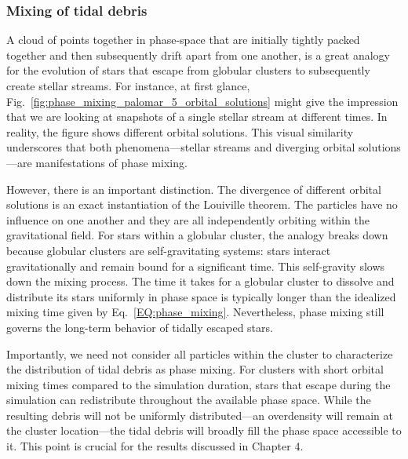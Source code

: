         \subsubsection{Mixing of tidal debris}

            A cloud of points together in phase-space that are initially tightly packed together and then subsequently drift apart from one another, is a great analogy for the evolution of stars that escape from globular clusters to subsequently create stellar streams. For instance, at first glance, Fig.~\ref{fig:phase_mixing_palomar_5_orbital_solutions} might give the impression that we are looking at snapshots of a single stellar stream at different times. In reality, the figure shows different orbital solutions. This visual similarity underscores that both phenomena—stellar streams and diverging orbital solutions—are manifestations of phase mixing. 
            
            However, there is an important distinction. The divergence of different orbital solutions is an exact instantiation of the Louiville theorem. The particles have no influence on one another and they are all independently orbiting within the gravitational field. For stars within a globular cluster, the analogy breaks down because globular clusters are self-gravitating systems: stars interact gravitationally and remain bound for a significant time. This self-gravity slows down the mixing process. The time it takes for a globular cluster to dissolve and distribute its stars uniformly in phase space is typically longer than the idealized mixing time given by Eq.~\ref{EQ:phase_mixing}. Nevertheless, phase mixing still governs the long-term behavior of tidally escaped stars.

            Importantly, we need not consider all particles within the cluster to characterize the distribution of tidal debris as phase mixing. For clusters with short orbital mixing times compared to the simulation duration, stars that escape during the simulation can redistribute throughout the available phase space. While the resulting debris will not be uniformly distributed—an overdensity will remain at the cluster location—the tidal debris will broadly fill the phase space accessible to it. This point is crucial for the results discussed in Chapter 4.

